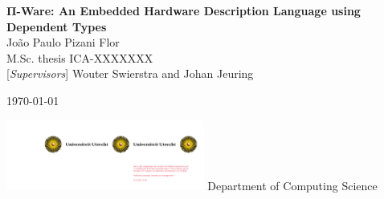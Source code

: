 

\begin{titlepage}

    \HRule
    \begin{flushright}
        \Huge \textbf{Π-Ware: An Embedded Hardware Description Language using Dependent Types}\\[10.0pt]%
        \LARGE João Paulo Pizani Flor\\[1.5pt]%
        \vfill
        \large M.Sc. thesis
        ICA-XXXXXXX\\
        \large {[}\emph{Supervisors}{]} Wouter Swierstra and Johan Jeuring \\[7mm]
    \end{flushright}
    \begin{center}%
        \today%
    \end{center}%
    \vskip -3mm
    \HRule
    \vfill
    \hfill \includegraphics[width=6.5cm]{imgs/uusol-links.pdf}
    \vskip 3mm
    \hfill {\large Department of Computing Science}
\end{titlepage}

\clearpage


\restoregeometry
